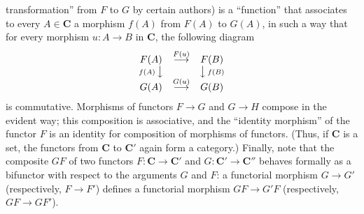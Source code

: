 
\noindent transformation'' from $F$ to $G$ by certain authors) is a
``function'' that associates to every $A\in \mathbf{C}$ a morphism $f(A)$ from $F(A)$
to $G(A)$, in such a way that for every morphism $u:A\to B$ in
$\mathbf{C}$, the following diagram
\[
\begin{array}{ccc}
F(A) & \stackrel{F(u)}{\longrightarrow} & F(B) \\
{\scriptstyle f(A)}\,\big\downarrow && \big\downarrow\,{\scriptstyle f(B)} \\
G(A) & \stackrel{G(u)}{\longrightarrow} & G(B)
\end{array}
\]
is commutative. Morphisms of functors $F\to G$ and
$G\to H$ compose in the evident way; this composition is
associative, and the ``identity morphism'' of the functor $F$ is an identity
for composition of morphisms of functors. (Thus, if $\mathbf{C}$ is a set, the functors
from $\mathbf{C}$ to $\mathbf{C}'$ again form a category.) Finally, note that the composite $GF$
of two functors $F:\mathbf{C}\to \mathbf{C}'$ and $G:\mathbf{C}'\to \mathbf{C}''$ behaves
formally as a bifunctor with respect to the arguments $G$ and $F$: a functorial
morphism $G\to G'$ (respectively, $F\to F'$) defines a
functorial morphism $GF\to G'F$ (respectively,
$GF\to GF'$).

